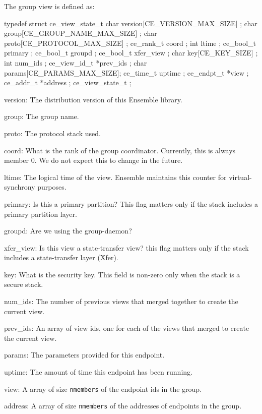 The group view is defined as: 
\begin{codebox}
typedef struct ce_view_state_t {
    char version[CE_VERSION_MAX_SIZE] ;     
    char group[CE_GROUP_NAME_MAX_SIZE] ;    
    char proto[CE_PROTOCOL_MAX_SIZE] ;      
    ce_rank_t coord ;              
    int ltime ;                    
    ce_bool_t primary ;            
    ce_bool_t groupd ;             
    ce_bool_t xfer_view ;          
    char key[CE_KEY_SIZE] ;        
    int num_ids ;                  
    ce_view_id_t *prev_ids ;       
    char params[CE_PARAMS_MAX_SIZE];
    ce_time_t uptime ;             
    ce_endpt_t *view ;             
    ce_addr_t  *address ;          
} ce_view_state_t ;
\end{codebox}

\begin{description}
\item{version:} The distribution version of this Ensemble library.
\item{group:} The group name. 
\item{proto:} The protocol stack used.
\item{coord:} What is the rank of the group coordinator. Currently,
  this is always member 0. We do not expect this to change in the
  future.               
\item{ltime:} The logical time of the view. Ensemble maintains this
  counter for virtual-synchrony purposes.                      
\item{primary:} Is this a primary partition? This flag matters only if
  the stack includes a primary partition layer.             
\item{groupd:} Are we using the group-daemon? 
\item{xfer\_view:} Is this view a state-transfer view? this flag
  matters only if the stack includes a state-transfer layer (Xfer). 
\item{key:}  What is the security key. This field is non-zero only
  when the stack is a secure stack. 
\item{num\_ids:} The number of previous views that merged together to
  create the current view. 
\item{prev\_ids:} An array of view ids, one for each of the views that
  merged to create the current view. 
\item{params:} The parameters provided for this endpoint. 
\item{uptime:} The amount of time this endpoint has been running.              
\item{view:} A array of size {\tt nmembers} of the endpoint ids in the group.
\item{address:} A array of size {\tt nmembers} of the addresses of
  endpoints in the group.
\end{description}


